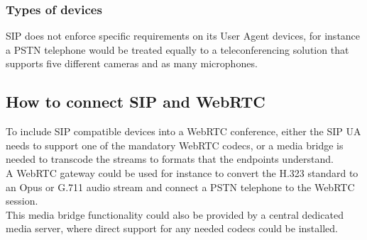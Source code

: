 \documentclass[../../../thesis.tex]{subfiles}
\begin{document}
\subsubsection{Types of devices}
SIP does not enforce specific requirements on its User Agent devices, for instance a PSTN telephone would be treated equally to a teleconferencing solution that supports five different cameras and as many microphones.

\subsection{How to connect SIP and WebRTC}
To include SIP compatible devices into a WebRTC conference, either the SIP UA needs to support one of the mandatory WebRTC codecs, or a media bridge is needed to transcode the streams to formats that the endpoints understand.\\

\noindent
A WebRTC gateway could be used for instance to convert the H.323 standard to an Opus or G.711 audio stream and connect a PSTN telephone to the WebRTC session.\\

\noindent
This media bridge functionality could also be provided by a central dedicated media server, where direct support for any needed codecs could be installed.
\end{document}
